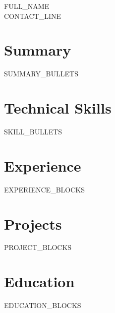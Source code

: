 \documentclass[10pt]{article}
\begin{document}
\begin{center}
{\Large {{FULL_NAME}}}\\
{{CONTACT_LINE}}\\
\end{center}
\vspace{-6pt}

\section*{Summary}
\begin{itemize}
{{SUMMARY_BULLETS}}
\end{itemize}

\section*{Technical Skills}
\begin{itemize}
{{SKILL_BULLETS}}
\end{itemize}

\section*{Experience}
{{EXPERIENCE_BLOCKS}}

\section*{Projects}
{{PROJECT_BLOCKS}}

\section*{Education}
{{EDUCATION_BLOCKS}}
\end{document}
